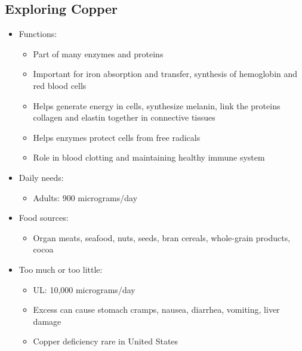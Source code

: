 \documentclass[12pt]{article}
\begin{document}
        \subsection{Exploring Copper}
            \begin{itemize}
                \item Functions:
                    \begin{itemize}
                        \item Part of many enzymes and proteins
                        \item Important for iron absorption and transfer, synthesis of hemoglobin and red blood cells
                        \item Helps generate energy in cells, synthesize melanin, link the proteins collagen and elastin together in connective tissues
                        \item Helps enzymes protect cells from free radicals
                        \item Role in blood clotting and maintaining healthy immune system
                    \end{itemize}
                \item Daily needs:
                    \begin{itemize}
                        \item Adults: 900 micrograms/day
                    \end{itemize}
                \item Food sources:
                    \begin{itemize}
                        \item Organ meats, seafood, nuts, seeds, bran cereals, whole-grain products, cocoa
                    \end{itemize}
                \item Too much or too little:
                    \begin{itemize}
                        \item UL: 10,000 micrograms/day
                        \item Excess can cause stomach cramps, nausea, diarrhea, vomiting, liver damage
                        \item Copper deficiency rare in United States
                    \end{itemize}
            \end{itemize}
\end{document}
